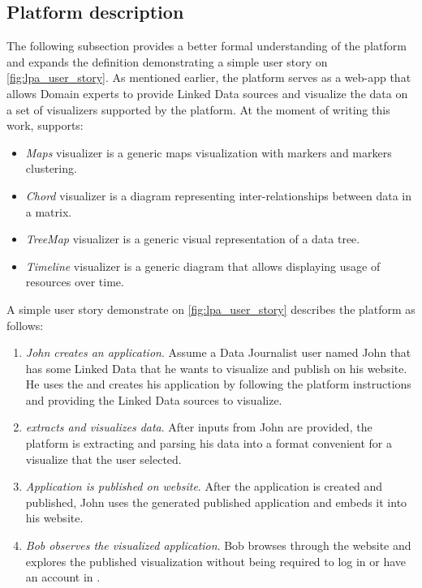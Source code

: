 \subsection{Platform description}

The following subsection provides a better formal understanding of the platform and expands the definition demonstrating a simple user story on \autoref{fig:lpa_user_story}. As mentioned earlier, the platform serves as a web-app that allows Domain experts to provide Linked Data sources and visualize the data on a set of visualizers supported by the platform. At the moment of writing this work, \lpa{} supports:
\begin{itemize}
    \item \textit{Maps} visualizer is a generic maps visualization with markers and markers clustering.
    \item \textit{Chord} visualizer is a diagram representing inter-relationships between data in a matrix.
    \item \textit{TreeMap} visualizer is a generic visual representation of a data tree.
    \item \textit{Timeline} visualizer is a generic diagram that allows displaying usage of resources over time.
\end{itemize}  

A simple user story demonstrate on \autoref{fig:lpa_user_story} describes the platform as follows:
\begin{enumerate}
    \item \textit{John creates an application}. Assume a Data Journalist user named John that has some Linked Data that he wants to visualize and publish on his website. He uses the \lpa{} and creates his application by following the platform instructions and providing the Linked Data sources to visualize.  
    \item \textit{\lpa{} extracts and visualizes data}. After inputs from John are provided, the platform is extracting and parsing his data into a format convenient for a visualize that the user selected.
    \item \textit{Application is published on website}. After the application is created and published, John uses the generated published application and embeds it into his website.
    \item \textit{Bob observes the visualized application}. Bob browses through the website and explores the published visualization without being required to log in or have an account in \lpa{}.
\end{enumerate}

